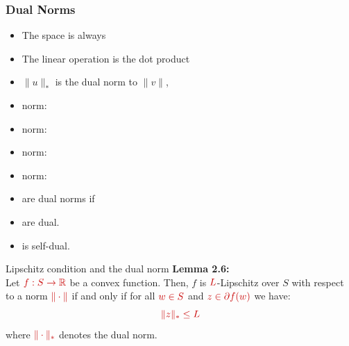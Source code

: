 \documentclass{beamer}
\newcommand{\mathred}[1]{\textcolor{mathred}{#1}}
\begin{document}
\begin{small}
\begin{frame}
\frametitle{Dual Norms}
\begin{itemize}
  \item The space is always 
  \item The linear operation is the dot product \R{$\vu \cdot \vv$}
   \item $\|u\|_*$ is the dual norm to $\|v\|$, 
\item {} norm: 
\item {} norm: 
\item {} norm: 
\item {} norm: 
\item {} are dual norms if 
\item {} are dual.
\item {} is self-dual. 
\end{itemize}
\end{frame}

\begin{frame}{Lipschitz condition and the dual norm}
\textbf{Lemma 2.6:}\\
Let $\mathred{f:S \to \mathbb{R}}$ be a convex function. Then, $f$ is $\mathred{L}$-Lipschitz over $S$ with respect to a norm $\mathred{\|\cdot\|}$ if and only if for all $\mathred{w \in S}$ and $\mathred{z \in \partial f(w)}$ we have:
\begin{equation*}
\mathred{\|z\|_* \leq L}
\end{equation*}
where $\mathred{\|\cdot\|_*}$ denotes the dual norm.
\end{frame}


\end{small}
\end{document}
